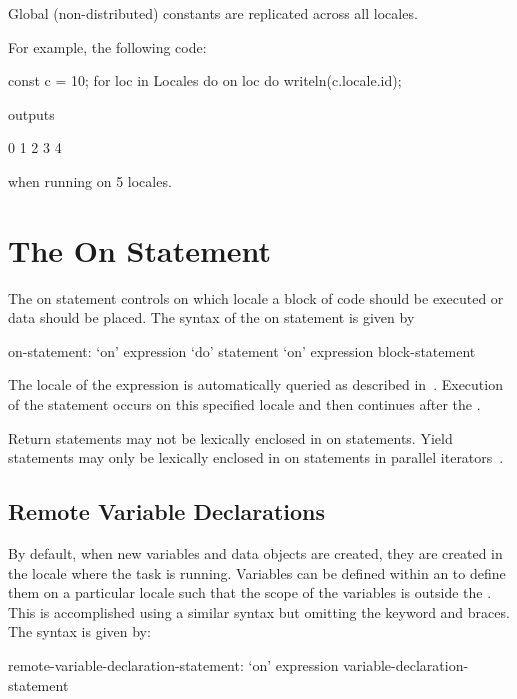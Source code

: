 Global (non-distributed) constants are replicated across all locales.
\begin{example}
For example, the following code:
%
%
\begin{chapel}
const c = 10;
for loc in Locales do on loc do
    writeln(c.locale.id);
\end{chapel}
outputs
\begin{chapelprintoutput}{}
0
1
2
3
4
\end{chapelprintoutput}
when running on 5 locales.
\end{example}


\section{The On Statement}
\label{On}

The on statement controls on which locale a block of code should be
executed or data should be placed.  The syntax of the on statement is
given by
\begin{syntax}
on-statement:
  `on' expression `do' statement
  `on' expression block-statement
\end{syntax}
The locale of the expression is automatically queried as described
in~.  Execution of the
statement occurs on this specified locale and then continues after
the .

Return statements may not be lexically enclosed in on statements.
Yield statements may only be lexically enclosed in on statements in
parallel iterators~.

\subsection{Remote Variable Declarations}
\label{remote_variable_declarations}

By default, when new variables and data objects are created, they are
created in the locale where the task is running.  Variables can be
defined within an  to define them on a particular
locale such that the scope of the variables is outside
the .  This is accomplished using a similar syntax
but omitting the  keyword and braces.  The syntax is given
by:
\begin{syntax}
remote-variable-declaration-statement:
  `on' expression variable-declaration-statement
\end{syntax}
